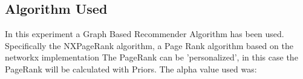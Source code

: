 \documentclass[12pt, a4paper]{article}
\begin{document}
\subsection{Algorithm Used}
In this experiment a Graph Based Recommender Algorithm has been used.
Specifically the NXPageRank algorithm, a Page Rank algorithm based on the networkx implementation
The PageRank can be 'personalized', in this case the PageRank will be calculated with Priors.
The alpha value used was: 




\end{document}
